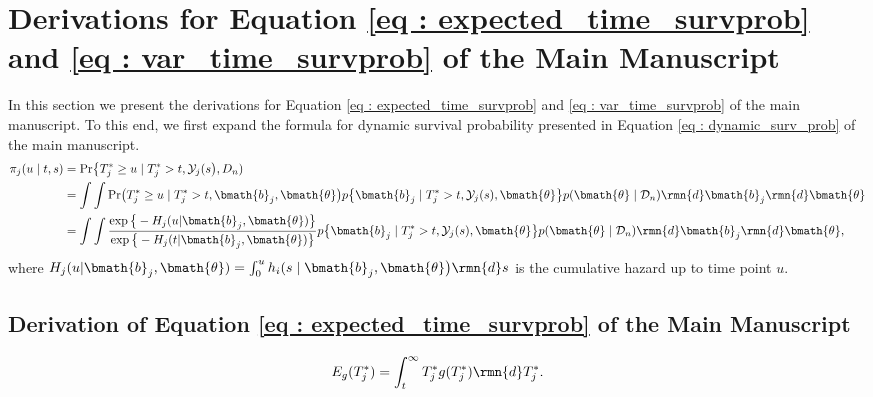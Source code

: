 \section{Derivations for Equation \ref{eq : expected_time_survprob} and \ref{eq : var_time_survprob} of the Main Manuscript}
In this section we present the derivations for Equation \ref{eq : expected_time_survprob} and \ref{eq : var_time_survprob} of the main manuscript. To this end, we first expand the formula for dynamic survival probability presented in Equation \ref{eq : dynamic_surv_prob} of the main manuscript.
\begin{equation}
\label{eq : dyn_surv_prob_expanded}
\begin{split}
\pi_j(u \mid t, s) &= \mbox{Pr}\big\{T^*_j \geq u \mid  T^*_j >t, \mathcal{Y}_j(s\big), D_n)\\
&= \int \int \mbox{Pr}\big(T^*_j \geq u \mid  T^*_j >t, \bmath{b}_j,\bmath{\theta}\big) p\big\{\bmath{b}_j \mid T^*_j>t, \mathcal{Y}_j(s), \bmath{\theta}\big\} p(\bmath{\theta} \mid \mathcal{D}_n) \rmn{d} \bmath{b}_j \rmn{d} \bmath{\theta}\\
&= \int \int \frac{\exp\big\{-H_j(u | \bmath{b}_j, \bmath{\theta})\big\}}{\exp\big\{-H_j(t | \bmath{b}_j, \bmath{\theta})\big\}} p\big\{\bmath{b}_j \mid T^*_j>t, \mathcal{Y}_j(s), \bmath{\theta}\big\} p(\bmath{\theta} \mid \mathcal{D}_n) \rmn{d} \bmath{b}_j \rmn{d} \bmath{\theta},
\end{split}
\end{equation}
where $H_j(u | \bmath{b}_j, \bmath{\theta}) = \int_0^u h_i(s \mid \bmath{b}_j, \bmath{\theta}\big)\rmn{d} s$ is the cumulative hazard up to time point $u$.

\subsection{Derivation of Equation \ref{eq : expected_time_survprob} of the Main Manuscript}
\begin{equation*}
E_g(T^*_j) = \int_t^{\infty} T^*_j g(T^*_j)\rmn{d} T^*_j.
\end{equation*}

